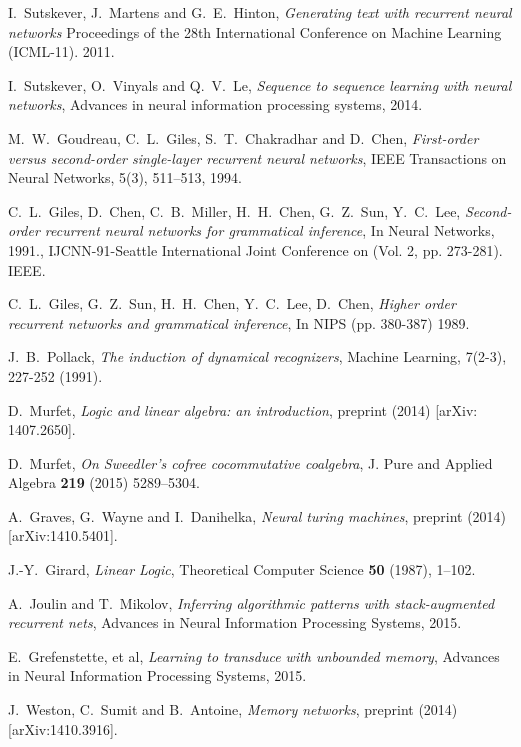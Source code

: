 \documentclass[english,letter paper,12pt,leqno]{article}
\theoremstyle{example}
\numberwithin{equation}{section}
\begin{document}
\begin{thebibliography}{BHLS03}
I.~Sutskever, J.~Martens and G.~E.~Hinton, \textsl{Generating text with recurrent neural networks} Proceedings of the 28th International Conference on Machine Learning (ICML-11). 2011.

I.~Sutskever, O.~Vinyals and Q.~V.~Le, \textsl{Sequence to sequence learning with neural networks}, Advances in neural information processing systems, 2014.

M.~W.~Goudreau, C.~L.~Giles, S.~T.~Chakradhar and D.~Chen, \textsl{First-order versus second-order single-layer recurrent neural networks}, IEEE Transactions on Neural Networks, 5(3), 511--513, 1994.

C.~L.~Giles, D.~Chen, C.~B.~Miller, H.~H.~Chen, G.~Z.~Sun, Y.~C.~Lee, \textsl{Second-order recurrent neural networks for grammatical inference}, In Neural Networks, 1991., IJCNN-91-Seattle International Joint Conference on (Vol. 2, pp. 273-281). IEEE.

C.~L.~Giles, G.~Z.~Sun, H.~H.~Chen, Y.~C.~Lee, D.~Chen, \textsl{Higher order recurrent networks and grammatical inference}, In NIPS (pp. 380-387) 1989.

J.~B.~Pollack, \textsl{The induction of dynamical recognizers}, Machine Learning, 7(2-3), 227-252 (1991). 

D.~Murfet, \textsl{Logic and linear algebra: an introduction}, preprint (2014) [arXiv: 1407.2650].

D.~Murfet, \textsl{On Sweedler's cofree cocommutative coalgebra}, J. Pure and Applied Algebra \textbf{219} (2015) 5289--5304.

A.~Graves, G.~Wayne and I.~Danihelka, \textsl{Neural turing machines}, preprint (2014) [arXiv:1410.5401].

J.-Y.~Girard, \textsl{Linear Logic}, Theoretical Computer Science \textbf{50} (1987), 1--102.

A.~Joulin and T.~Mikolov, \textsl{Inferring algorithmic patterns with stack-augmented recurrent nets}, Advances in Neural Information Processing Systems, 2015.

E.~Grefenstette, et al, \textsl{Learning to transduce with unbounded memory}, Advances in Neural Information Processing Systems, 2015.

J.~Weston, C.~Sumit and B.~Antoine, \textsl{Memory networks}, preprint (2014) [arXiv:1410.3916].


\end{thebibliography}
\end{document}
